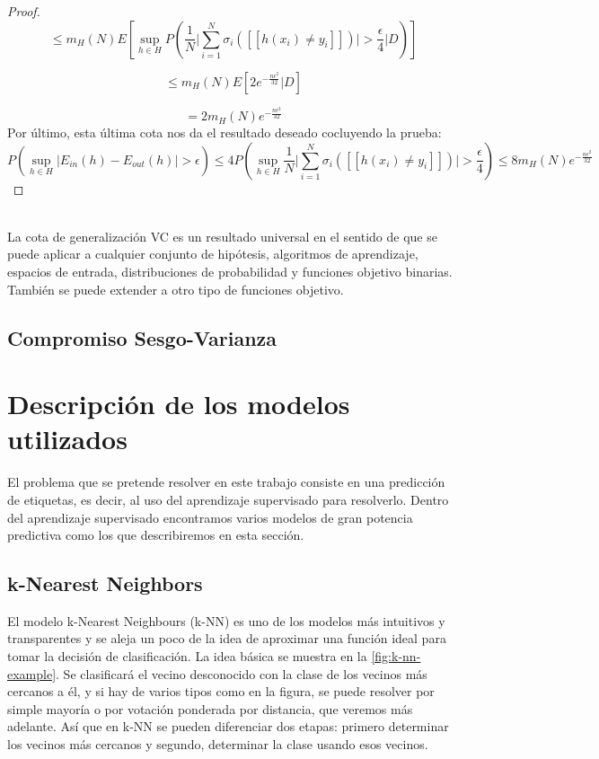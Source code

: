\begin{proof}
\[ \leq m_{H}(N) E \left[ \sup_{h \in H} P \left( \frac{1}{N} \bigg\vert \sum_{i=1}^{N} \sigma_{i} ( [[ h(x_{i}) \neq y_{i} ]])\bigg\vert > \frac{\epsilon}{4} \bigg\vert D \right) \right] \]

\[\leq m_{H}(N) E \left[ 2 e^{ -\frac{ n\epsilon^{2} }{ 32 } } \vert D \right] \]

\[ = 2 m_{H}(N)e^{ -\frac{ n\epsilon^{2} }{ 32 } } \]
Por último, esta última cota nos da el resultado deseado cocluyendo la prueba:
\[ P \left( \sup_{h \in H} \vert E_{in}(h)-E_{out}(h) \vert >\epsilon \right) \leq 4P \left( \sup_{h \in H} \frac{1}{N} \bigg\vert \sum_{i=1}^{N} \sigma_{i} ( [[ h(x_{i}) \neq y_{i} ]])\bigg\vert > \frac{\epsilon}{4} \right) \leq 8 m_{H}(N)e^{ -\frac{ n\epsilon^{2} }{ 32 } } \]
\end{proof} \cite{VCboundRNowak}\\
La cota de generalización VC es un resultado universal en el sentido de que se puede aplicar a cualquier conjunto de hipótesis, algoritmos de aprendizaje, espacios de entrada, distribuciones de probabilidad y funciones objetivo binarias. También se puede extender a otro tipo de funciones objetivo. \cite{abu2012learning}
\subsection{Compromiso Sesgo-Varianza}
\section{Descripción de los modelos utilizados}\label{st:modelos-utilizados}
El problema que se pretende resolver en este trabajo consiste en una predicción de etiquetas, es decir, al uso del aprendizaje supervisado para resolverlo. Dentro del aprendizaje supervisado encontramos varios modelos de gran potencia predictiva como los que describiremos en esta sección.
\subsection{k-Nearest Neighbors}\label{sst:k-nn}
El modelo k-Nearest Neighbours (k-NN) es uno de los modelos más intuitivos y transparentes y se aleja un poco de la idea de aproximar una función ideal para tomar la decisión de clasificación. La idea básica se muestra en la \autoref{fig:k-nn-example}. Se clasificará el vecino desconocido con la clase de los vecinos más cercanos a él, y si hay de varios tipos como en la figura, se puede resolver por simple mayoría o por votación ponderada por distancia, que veremos más adelante. Así que en k-NN se pueden diferenciar dos etapas: primero determinar los vecinos más cercanos y segundo, determinar la clase usando esos vecinos. \cite{padraiddelany2007k}

